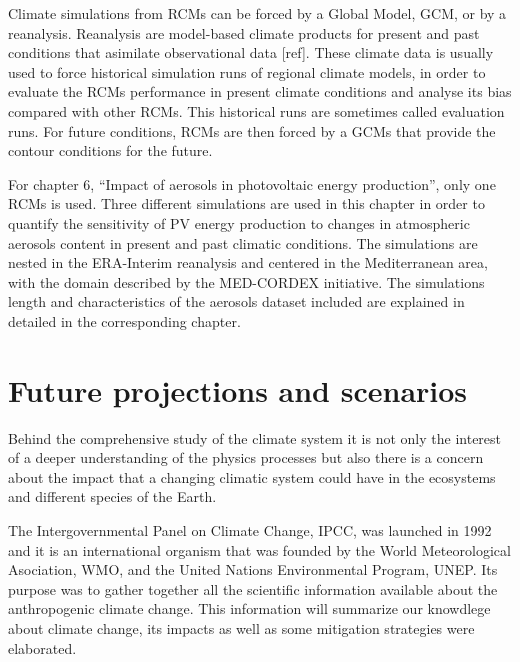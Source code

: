 Climate simulations from RCMs can be forced by a Global Model, GCM, or by a reanalysis. Reanalysis are model-based climate products for present and past conditions that asimilate observational data [ref]. These climate data is usually used to force historical simulation runs of regional climate models, in order to evaluate the RCMs performance in present climate conditions and analyse its bias compared with other RCMs. This historical runs are sometimes called evaluation runs. For future conditions, RCMs are then forced by a GCMs that provide the contour conditions for the future.  

For chapter 6, ``Impact of aerosols in photovoltaic energy production'', only one RCMs is used. Three different simulations are used in this chapter in order to quantify the sensitivity of PV energy production to changes in atmospheric aerosols content in present and past climatic conditions. The simulations are nested in the ERA-Interim reanalysis and centered in the Mediterranean area, with the domain described by the MED-CORDEX initiative. The simulations length and characteristics of the aerosols dataset included are explained in detailed in the corresponding chapter.



\section{Future projections and scenarios}

Behind the comprehensive study of the climate system it is not only the interest of a deeper understanding of the physics processes but also there is a concern about the impact that a changing climatic system could have in the ecosystems and different species of the Earth.

The Intergovernmental Panel on Climate Change, IPCC, was launched in 1992 and it is an international organism that was founded by the World Meteorological Asociation, WMO, and the United Nations Environmental Program, UNEP. Its purpose was to gather together all the scientific information available about the anthropogenic climate change. This information will summarize our knowdlege about climate change, its impacts as well as some mitigation strategies were elaborated.


